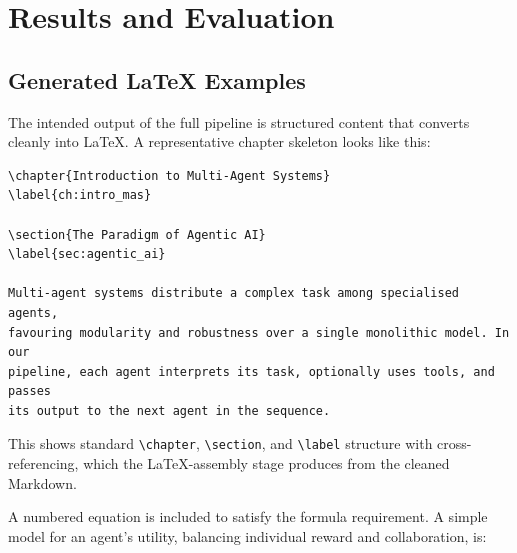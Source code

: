 
\chapter{Results and Evaluation}

\section{Generated LaTeX Examples}

The intended output of the full pipeline is structured content that converts
cleanly into \LaTeX{}. A representative chapter skeleton looks like this:

\begin{verbatim}
\chapter{Introduction to Multi-Agent Systems}
\label{ch:intro_mas}

\section{The Paradigm of Agentic AI}
\label{sec:agentic_ai}

Multi-agent systems distribute a complex task among specialised agents,
favouring modularity and robustness over a single monolithic model. In our
pipeline, each agent interprets its task, optionally uses tools, and passes
its output to the next agent in the sequence.
\end{verbatim}

This shows standard \verb|\chapter|, \verb|\section|, and \verb|\label|
structure with cross-referencing, which the \LaTeX{}-assembly stage produces
from the cleaned Markdown.

A numbered equation is included to satisfy the formula requirement. A simple
model for an agent's utility, balancing individual reward and collaboration,
is:


